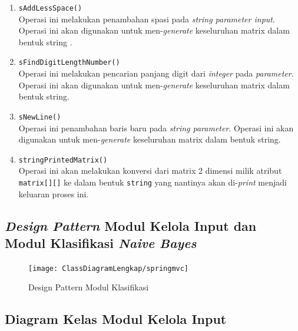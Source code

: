 \begin{enumerate}
\begin{enumerate}
\begin{itemize}
\begin{enumerate}
				\item \texttt{sAddLessSpace()}\\
				Operasi ini melakukan penambahan spasi pada \textit{string parameter input}. Operasi ini akan digunakan untuk men-\textit{generate} keseluruhan matrix dalam bentuk string	.
				
				\item \texttt{sFindDigitLengthNumber()}\\
				Operasi ini melakukan pencarian panjang digit dari \textit{integer} pada \textit{parameter}. Operasi ini akan digunakan untuk men-\textit{generate} keseluruhan matrix dalam bentuk string.
				
				\item \texttt{sNewLine()}\\
				Operasi ini penambahan baris baru pada \textit{string parameter}. Operasi ini akan digunakan untuk men-\textit{generate} keseluruhan matrix dalam bentuk string.
				
				\item \texttt{stringPrintedMatrix()}\\
				Operasi ini akan melakukan konversi dari matrix 2 dimensi milik atribut \texttt{matrix[][]} ke dalam bentuk \texttt{string} yang nantinya akan di-\textit{print} menjadi keluaran proses ini.
				
			\end{enumerate}					

		\end{itemize}
		
	\end{enumerate}
	
	
\end{enumerate}



\subsection{\textit{Design Pattern} Modul Kelola Input dan Modul Klasifikasi \textit{Naive Bayes}}
\begin{figure}[H]
	\centering
	\texttt{[image: ClassDiagramLengkap/springmvc]}
	\caption[Design Pattern Modul Klasifikasi]{Design Pattern Modul Klasifikasi}
	\label{fig:Design Pattern Modul Klasifikasi}
\end{figure}


\subsection{Diagram Kelas Modul Kelola Input}

